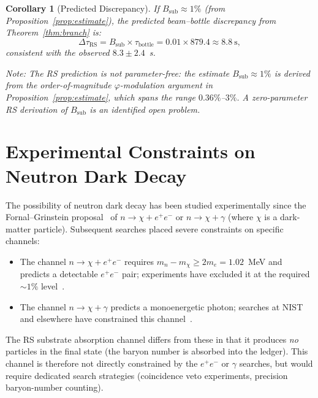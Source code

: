 \documentclass[12pt,a4paper]{article}
\newtheorem{corollary}[theorem]{Corollary}
\theoremstyle{definition}
\theoremstyle{remark}
\begin{document}
\begin{corollary}[Predicted Discrepancy]
\label{thm:predict}
If $B_{\mathrm{sub}} \approx 1\%$ (from Proposition~\ref{prop:estimate}),
the predicted beam--bottle discrepancy from Theorem~\ref{thm:branch} is:
\begin{equation}
  \Delta\tau_{\mathrm{RS}} = B_{\mathrm{sub}} \times \tau_{\mathrm{bottle}}
  = 0.01 \times 879.4 \approx 8.8~\mathrm{s},
\end{equation}
consistent with the observed $8.3 \pm 2.4$~s.

\emph{Note}: The RS prediction is not parameter-free: the estimate
$B_{\mathrm{sub}} \approx 1\%$ is derived from the order-of-magnitude
$\varphi$-modulation argument in Proposition~\ref{prop:estimate}, which
spans the range $0.36\%$--$3\%$.  A zero-parameter RS derivation of
$B_{\mathrm{sub}}$ is an identified open problem.
\end{corollary}

\section{Experimental Constraints on Neutron Dark Decay}
\label{sec:constraints}

The possibility of neutron dark decay has been studied experimentally
since the Fornal--Grinstein proposal~\cite{Fornal2018} of
$n \to \chi + e^+e^-$ or $n \to \chi + \gamma$ (where $\chi$ is a
dark-matter particle).  Subsequent searches placed severe constraints
on specific channels:

\begin{itemize}
  \item The channel $n \to \chi + e^+e^-$ requires
  $m_n - m_\chi \geq 2m_e = 1.02$~MeV and predicts a detectable
  $e^+e^-$ pair; experiments have excluded it at the
  required $\sim 1\%$ level~\cite{Tang2018}.
  \item The channel $n \to \chi + \gamma$ predicts a monoenergetic photon;
  searches at NIST and elsewhere have constrained this
  channel~\cite{Sun2020}.
\end{itemize}

The RS substrate absorption channel differs from these in that it
produces \emph{no} particles in the final state (the baryon number is
absorbed into the ledger).  This channel is therefore not directly
constrained by the $e^+e^-$ or $\gamma$ searches, but would require
dedicated search strategies (coincidence veto experiments, precision
baryon-number counting).
\end{document}
